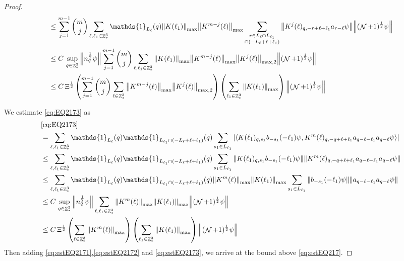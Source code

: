 \documentclass[sn-mathphys, Numbered ,a4paper]{sn-jnl}%
\DeclareMathOperator{\Z}{\mathbb{Z}}
\DeclareMathOperator{\NN}{\mathcal{N}}
\newcommand{\half}{\frac{1}{2}}
\newcommand{\eva}[1]{\left\langle #1 \right\rangle}
\theoremstyle{plain}
\theoremstyle{definition}
\theoremstyle{remark}
\theoremstyle{plain}
\theoremstyle{definition}
\theoremstyle{remark}
\begin{document}
\begin{proof}
\begin{align}
	&\leq\sum\limits_{j=1}^{m-1} {{m}\choose j} \sum\limits_{\ell, \ell_1\in \Z^3_*}\mathds{1}_{L_{\ell}}(q) \norm{K(\ell_1)}_{\mathrm{max}} \norm{K^{m-j}(\ell)}_{\mathrm{max}} \sum\limits_{\substack{r\in L_{\ell} \cap L_{\ell_1} \\ \cap (-L_{\ell}+\ell+\ell_1)}}  \norm{ K^j(\ell)_{q,-r+\ell+\ell_1} a_{r-\ell} \psi } \norm{ (\NN+1)^\half \psi}\nonumber\\
	&\leq C\,\sup\limits_{q\in \Z^3_*}\norm{n_q^\half\psi} \sum\limits_{j=1}^{m-1} {{m}\choose j} \sum\limits_{\ell, \ell_1\in \Z^3_*} \norm{K(\ell_1)}_{\mathrm{max}} \norm{K^{m-j}(\ell)}_{\mathrm{max}} \norm{K^{j}(\ell)}_{\mathrm{max},2} \norm{ (\NN+1)^\half \psi}\nonumber\\
	&\leq  C\,\Xi^\half \left( \sum\limits_{j=1}^{m-1} {{m}\choose j} \sum\limits_{\ell \in \Z^3_*} \norm{K^{m-j}(\ell)}_{\mathrm{max}} \norm{ K^{j}(\ell)}_{\mathrm{max},2}\right) \left( \sum\limits_{ \ell_1\in \Z^3_*}\norm{ K(\ell_1) }_{\mathrm{max}} \right) \norm{ (\NN+1)^{\frac{1}{2}} \psi }\label{eq:estEQ2172}
\end{align}

We estimate \eqref{eq:EQ2173} as
\begin{align}
	&\eqref{eq:EQ2173}\nonumber\\
	&=\sum\limits_{\ell, \ell_1\in \Z^3_*} \mathds{1}_{L_{\ell}}(q) \mathds{1}_{L_{\ell_1}\cap (-L_{\ell}+\ell+\ell_1)}(q) \sum\limits_{s_1\in L_{\ell_1}} \abs{\eva{ K(\ell_1)_{q,s_1} b_{-s_1}(-\ell_1) \psi, K^m(\ell)_{q,-q+\ell+\ell_1} a_{q-\ell-\ell_1} a_{q-\ell} \psi }}\nonumber\\
	&\leq\sum\limits_{\ell, \ell_1\in \Z^3_*} \mathds{1}_{L_{\ell}}(q) \mathds{1}_{L_{\ell_1}\cap (-L_{\ell}+\ell+\ell_1)}(q) \sum\limits_{s_1\in L_{\ell_1}} \norm{ K(\ell_1)_{q,s_1} b_{-s_1}(-\ell_1) \psi}\norm{ K^m(\ell)_{q,-q+\ell+\ell_1} a_{q-\ell-\ell_1} a_{q-\ell} \psi }\nonumber\\
	&\leq\sum\limits_{\ell, \ell_1\in \Z^3_*} \mathds{1}_{L_{\ell}}(q) \mathds{1}_{L_{\ell_1}\cap (-L_{\ell}+\ell+\ell_1)}(q)\norm{K^m(\ell)}_{\mathrm{max}} \norm{K(\ell_1)}_{\mathrm{max}} \sum\limits_{s_1 \in L_{\ell_1}} \norm{ b_{-s_1}(-\ell_1) \psi}\norm{ a_{q-\ell-\ell_1} a_{q-\ell} \psi } \nonumber\\ 
	&\leq C\,\sup\limits_{q\in \Z^3_*}\norm{n_q^\half\psi} \sum\limits_{\ell, \ell_1\in \Z^3_*}  \norm{K^m(\ell)}_{\mathrm{max}} \norm{K(\ell_1)}_{\mathrm{max}}\norm{(\NN+1)^\half\psi}\nonumber\\
	&\leq C\, \Xi^\half \left(\sum\limits_{\ell \in \Z^3_*} \norm{K^m(\ell)}_{\mathrm{max}}\right)\left( \sum\limits_{\ell_1\in \Z^3_*} \norm{ K(\ell_1)}_{\mathrm{max}} \right) \norm{(\NN+1)^\half\psi}\label{eq:estEQ2173}
\end{align}
Then adding \eqref{eq:estEQ2171},\eqref{eq:estEQ2172} and \eqref{eq:estEQ2173}, we arrive at the bound above \eqref{eq:estEQ217}. 
\end{proof}
\end{document}
